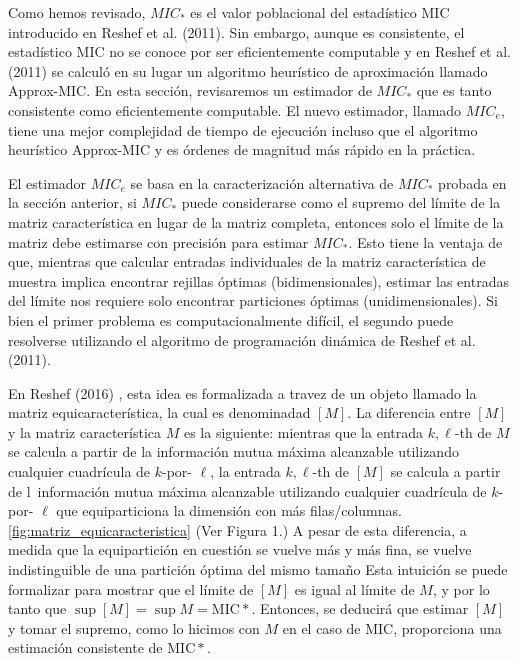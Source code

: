 	Como hemos revisado, $MIC_*$ es el valor poblacional del estad\'istico MIC introducido en Reshef et al. (2011). Sin embargo, aunque es consistente, el estad\'istico MIC no se conoce por ser eficientemente computable y en Reshef et al. (2011) se calcul\'o en su lugar un algoritmo heur\'istico de aproximaci\'on llamado Approx-MIC. En esta secci\'on, revisaremos un estimador de $MIC_*$ que es tanto consistente como eficientemente computable. El nuevo estimador, llamado $MIC_e$, tiene una mejor complejidad de tiempo de ejecuci\'on incluso que el algoritmo heur\'istico Approx-MIC y es \'ordenes de magnitud m\'as r\'apido en la pr\'actica.

	El estimador $MIC_e$ se basa en la caracterizaci\'on alternativa de $MIC_*$ probada en la secci\'on anterior, si $MIC_*$ puede considerarse como el supremo del l\'imite de la matriz caracter\'istica en lugar de la matriz completa, entonces solo el l\'imite de la matriz debe estimarse con precisi\'on para estimar $MIC_*$. Esto tiene la ventaja de que, mientras que calcular entradas individuales de la matriz caracter\'istica de muestra implica encontrar rejillas \'optimas (bidimensionales), estimar las entradas del l\'imite nos requiere solo encontrar particiones \'optimas (unidimensionales). Si bien el primer problema es computacionalmente dif\'icil, el segundo puede resolverse utilizando el algoritmo de programaci\'on din\'amica de Reshef et al.(2011)\cite{Reshef2011}.

	En Reshef (2016) \cite{Reshef2016}, esta idea es formalizada a travez de un objeto llamado la matriz equicaracter\'istica, la cual es denominadad $[M]$. La diferencia entre $[M]$ y la matriz caracter\'istica $M$ es la siguiente: mientras que la entrada $k, \ell$-th de $M$ se calcula a partir de la informaci\'on mutua m\'axima alcanzable utilizando cualquier cuadr\'icula de $k$-por- $\ell$, la entrada $k, \ell$-th de $[M]$ se calcula a partir de l\ informaci\'on mutua m\'axima alcanzable utilizando cualquier cuadr\'icula de $k$-por- $\ell$ que equiparticiona la dimensi\'on con m\'as filas/columnas. \ref{fig:matriz_equicaracteristica} (Ver Figura 1.) A pesar de esta diferencia, a medida que la equipartici\'on en cuesti\'on se vuelve m\'as y m\'as fina, se vuelve indistinguible de una partici\'on \'optima del mismo tama\~no Esta intuici\'on se puede formalizar para mostrar que el l\'imite de $[M]$ es igual al l\'imite de $M$, y por lo tanto que $\sup [M]=\sup M=\mathrm{MIC}*$. Entonces, se deducir\'a que estimar $[M]$ y tomar el supremo, como lo hicimos con $M$ en el caso de MIC, proporciona una estimaci\'on consistente de $\mathrm{MIC}*$.

